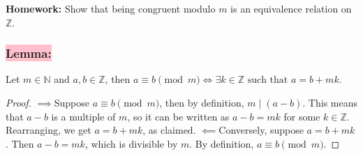         \qquad \textbf{Homework:} Show that being congruent modulo \( m \) is an equivalence relation on \( \mathbb{Z} \).
        
        
        \subsubsection{\colorbox{pink}{Lemma:}} 
        Let \( m \in \mathbb{N} \) and \( a, b \in \mathbb{Z} \), then \( a \equiv b \pmod{m} \iff \exists k \in \mathbb{Z} \text{ such that } a = b + mk.\) \newline
            \begin{minipage}[t]{1\textwidth}
                \vspace*{0.1cm}
                \begin{proof} 
                    \(\implies\)Suppose \( a \equiv b \pmod{m} \), then by definition, \( m \mid (a - b) \). This means that \( a - b \) is a multiple of \( m \), so it can be written as \( a - b = mk \) for some \( k \in \mathbb{Z} \). Rearranging, we get \( a = b + mk \), as claimed.
                    \(\impliedby\)Conversely, suppose \( a = b + mk \). Then \( a - b = mk \), which is divisible by \( m \). By definition, \( a \equiv b \pmod{m} \).
                \end{proof}
            \end{minipage}
            
            
